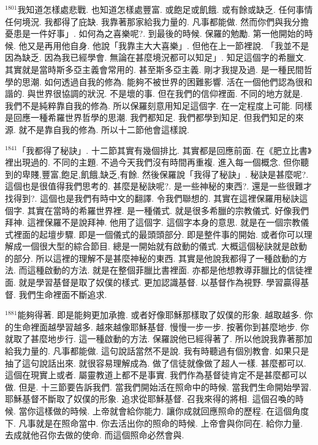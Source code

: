 \documentclass{book}
\begin{document}
$^{1801}$我知道怎樣處悲戰.
也知道怎樣處豐富.
或飽足或飢餓.
或有餘或缺乏.
任何事情 任何境況.
我都得了庇缺.
我靠著那家給我力量的.
凡事都能做.
然而你們與我分擔憂患是一件好事」.
如何為之喜樂呢?.
到最後的時候.
保羅的勉勵.
第一他開始的時候.
他又是再用他自身.
他說「我靠主大大喜樂」.
但他在上一節裡說.
「我並不是因為缺乏.
因為我已經學會.
無論在甚麼境況都可以知足」.
知足這個字的希臘文.
其實就是當時斯多亞主義會常用的.
甚至斯多亞主義.
剛才我提及過.
是一種民間哲學的思潮.
如何透過自我的修為.
能夠不被世界的困難影響.
活在一個他們認為很和諧的.
與世界很協調的狀況.
不是壞的事.
但在我們的信仰裡面.
不同的地方就是.
我們不是純粹靠自我的修為.
所以保羅刻意用知足這個字.
在一定程度上可能.
同樣是回應一種希羅世界哲學的思潮.
我們都知足.
我們都學到知足.
但我們知足的來源.
就不是靠自我的修為.
所以十二節他會這樣說.

$^{1841}$「我都得了秘訣」.
十二節其實有幾個排比.
其實都是回應前面.
在《肥立比書》裡出現過的.
不同的主題.
不過今天我們沒有時間再重複.
進入每一個概念.
但你聽到的卑賤,豐富,飽足,飢餓,缺乏,有餘.
然後保羅說「我得了秘訣」.
秘訣是甚麼呢?.
這個也是很值得我們思考的.
甚麼是秘訣呢?.
是一些神秘的東西?.
還是一些很難才找得到?.
這個也是我們有時中文的翻譯.
令我們聯想的.
其實在這裡保羅用秘訣這個字.
其實在當時的希羅世界裡.
是一種儀式.
就是很多希臘的宗教儀式.
好像我們拜神.
這裡保羅不是說拜神.
他用了這個字.
這個字本身的意思.
就是在一個宗教儀式裡面的起壇步驟.
即是一個儀式的最頭頭部分.
即是整件事的開始.
或者你可以理解成一個很大型的綜合節目.
總是一開始就有啟動的儀式.
大概這個秘訣就是啟動的部分.
所以這裡的理解不是甚麼神秘的東西.
其實是他說我都得了一種啟動的方法.
而這種啟動的方法.
就是在整個菲臘比書裡面.
亦都是他想教導菲臘比的信徒裡面.
就是學習基督是取了奴僕的樣式.
更加認識基督.
以基督作為視野.
學習贏得基督.
我們生命裡面不斷追求.

$^{1881}$能夠得著.
即是能夠更加承擔.
或者好像耶穌那樣取了奴僕的形象.
越取越多.
你的生命裡面越學習越多.
越來越像耶穌基督.
慢慢一步一步.
按著你到甚麼地步.
你就取了甚麼地步行.
這一種啟動的方法.
保羅說他已經得著了.
所以他說我靠著那加給我力量的.
凡事都能做.
這句說話當然不是說.
我有時聽過有個別教會.
如果只是抽了這句說話出來.
就很容易理解成為.
做了信徒就像做了超人一樣.
甚麼都可以.
這個在現實上或者.
屬靈教道上都不是事實.
我們作為基督徒肯定不是甚麼都可以做.
但是.
十三節要告訴我們.
當我們開始活在照命中的時候.
當我們生命開始學習.
耶穌基督不斷取了奴僕的形象.
追求從耶穌基督.
召我來得的將相.
這個召喚的時候.
當你這樣做的時候.
上帝就會給你能力.
讓你成就回應照命的歷程.
在這個角度下.
凡事就是在照命當中.
你去活出你的照命的時候.
上帝會與你同在.
給你力量.
去成就他召你去做的使命.
而這個照命必然會與.
\end{document}
